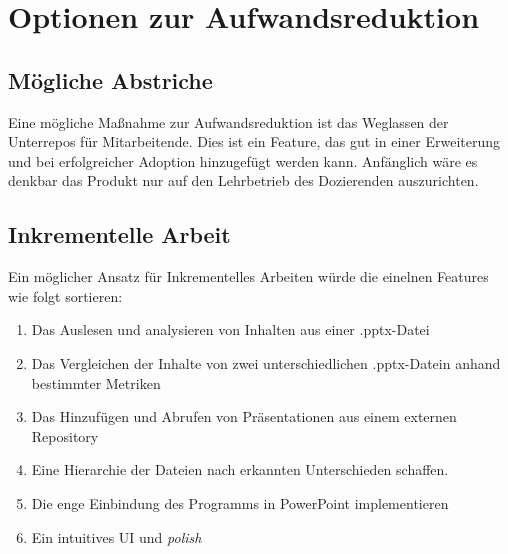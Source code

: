 \section{Optionen zur Aufwandsreduktion}


\subsection{Mögliche Abstriche}
Eine mögliche Maßnahme zur Aufwandsreduktion ist das Weglassen der Unterrepos für Mitarbeitende. Dies ist ein Feature, das gut in einer Erweiterung und bei erfolgreicher Adoption hinzugefügt werden kann.
\noindent Anfänglich wäre es denkbar das Produkt nur auf den Lehrbetrieb des Dozierenden auszurichten.

\subsection{Inkrementelle Arbeit}
Ein möglicher Ansatz für Inkrementelles Arbeiten würde die einelnen Features wie folgt sortieren:

\begin{enumerate}
    \item Das Auslesen und analysieren von Inhalten aus einer .pptx-Datei
    \item Das Vergleichen der Inhalte von zwei unterschiedlichen .pptx-Datein anhand bestimmter Metriken
    \item Das Hinzufügen und Abrufen von Präsentationen aus einem externen Repository
    \item Eine Hierarchie der Dateien nach erkannten Unterschieden schaffen.
    \item Die enge Einbindung des Programms in PowerPoint implementieren
    \item Ein intuitives UI und \textit{polish}
\end{enumerate}


